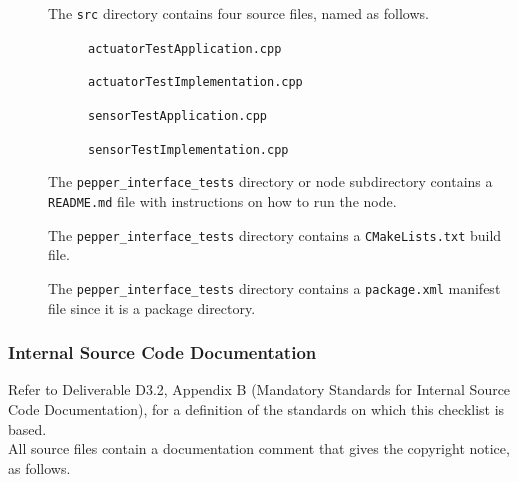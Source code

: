 \documentclass{CSSRforAfrica}
\newcommand{\checkboxChecked}{\fbox{\ding{51}}} %
\begin{document}
\begin{description}
\item[\checkboxChecked] The  {\small \verb+src+} directory contains four source files, named as follows.
\begin{description}
\item[\checkboxChecked] {\small \verb+actuatorTestApplication.cpp+}  
\item[\checkboxChecked]  {\small \verb+actuatorTestImplementation.cpp+} 
\item[\checkboxChecked] {\small \verb+sensorTestApplication.cpp+}  
\item[\checkboxChecked]  {\small \verb+sensorTestImplementation.cpp+} 
\end{description} 

\item[\checkboxChecked] The {\small \verb+pepper_interface_tests+} directory or node subdirectory contains  a {\small \verb+README.md+} file with  instructions on how to run the node.

\item[\checkboxChecked] The {\small \verb+pepper_interface_tests+} directory contains  a {\small \verb+CMakeLists.txt+} build file.

\item[\checkboxChecked] The {\small \verb+pepper_interface_tests+} directory contains  a {\small \verb+package.xml+} manifest file since it is a package directory.

\end{description}

\subsubsection{Internal Source Code Documentation}

Refer to Deliverable D3.2, Appendix B (Mandatory Standards for Internal Source Code Documentation), for a definition of the standards on which this checklist is based.\\

\noindent All source files contain a documentation comment that gives the copyright notice, as follows.
 
\end{document}
